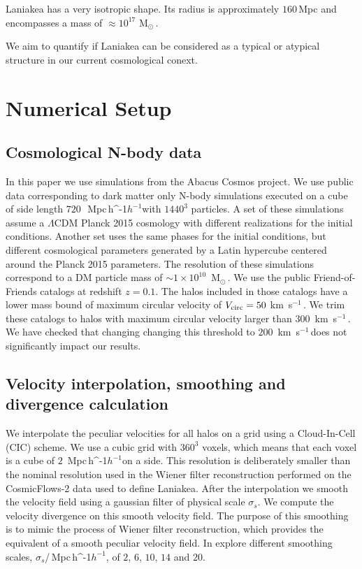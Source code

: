 \documentclass[usenatbib]{mnras}
\newcommand{\Msun}{\,{\rm M}$_{\odot}$\,}
\newcommand{\Mpch}{\,{\rm Mpc}\,\ifmmode h^{-1}\else $h^{-1}$\fi}
\newcommand{\kms}{\,{\rm km}\ s$^{-1}$\,}
\begin{document}
Laniakea has a very isotropic shape. 
Its radius is approximately $160$\,Mpc and encompasses a mass of
$\approx 10^{17}$\,\Msun.

We aim to quantify if Laniakea can be considered as a typical or atypical 
structure in our current cosmological conext.



\section{Numerical Setup}
\label{sec:numerical_setup}
\subsection{Cosmological N-body data}


In this paper we use simulations from the Abacus Cosmos project.
We use public data corresponding to dark matter only N-body
simulations executed on a cube of side length $720$\ \Mpch with
$1440^3$ particles.  
A set of these simulations assume a $\Lambda$CDM Planck 2015 cosmology
with different realizations for the initial conditions. 
Another set uses the same phases for the initial conditions, but
different cosmological parameters generated by a Latin hypercube
centered around the Planck 2015 parameters.  
The resolution of these simulations correspond to a DM particle mass
of $\sim 1 \times 10^{10}$ \Msun.
We use the public Friend-of-Friends catalogs at redshift $z=0.1$.
The halos included in those catalogs have a lower mass bound of 
maximum circular velocity of $V_{\rm circ}=50$\,\kms.
We trim these catalogs to halos with maximum circular velocity larger
than $300$ \kms. 
We have checked that changing changing this threshold to $200$ \kms does not
significantly impact our results. 



\subsection{Velocity interpolation, smoothing and divergence calculation}  

We interpolate the peculiar velocities for all halos on a grid using a
Cloud-In-Cell (CIC) scheme. 
We use a cubic grid with $360^3$ voxels, which means that each voxel
is a cube of $2$ \Mpch on a side.  
This resolution is deliberately smaller than the nominal resolution
used in the Wiener filter reconstruction performed on the
CosmicFlows-2 data used to define Laniakea. 
After the interpolation we smooth the velocity field using a gaussian
filter of physical scale $\sigma_s$.  
We compute the velocity divergence on this smooth velocity field. 
The purpose of this smoothing is to mimic the process of Wiener filter
reconstruction, which provides the equivalent of a smooth peculiar
velocity field. 
In explore different smoothing scales, $\sigma_s$/\Mpch, of $2$, $6$,
$10$, $14$ and $20$. 
\end{document}
